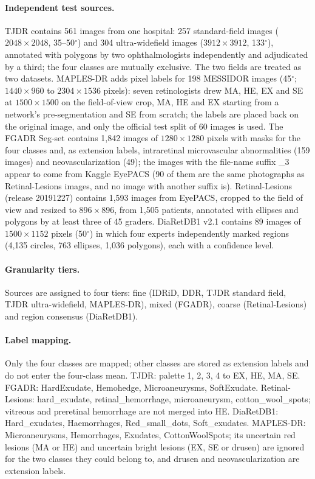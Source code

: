 \paragraph{Independent test sources.} TJDR\cite{mao2023tjdr} contains 561 images from one hospital: 257 standard-field images ($2048\times2048$, 35--50$^\circ$) and 304 ultra-widefield images ($3912\times3912$, 133$^\circ$), annotated with polygons by two ophthalmologists independently and adjudicated by a third; the four classes are mutually exclusive. The two fields are treated as two datasets. MAPLES-DR\cite{maplesdr2024scientificdata} adds pixel labels for 198 MESSIDOR\cite{decenciere2014messidor} images (45$^\circ$; $1440\times960$ to $2304\times1536$ pixels): seven retinologists drew MA, HE, EX and SE at $1500\times1500$ on the field-of-view crop, MA, HE and EX starting from a network's pre-segmentation and SE from scratch; the labels are placed back on the original image, and only the official test split of 60 images is used. The FGADR Seg-set\cite{zhou2021fgadr} contains 1,842 images of $1280\times1280$ pixels with masks for the four classes and, as extension labels, intraretinal microvascular abnormalities (159 images) and neovascularization (49); the images with the file-name suffix \_3 appear to come from Kaggle EyePACS (90 of them are the same photographs as Retinal-Lesions images, and no image with another suffix is). Retinal-Lesions\cite{wei2020retinallesionslesionnet} (release 20191227) contains 1,593 images from EyePACS\cite{cuadros2009eyepacs}, cropped to the field of view and resized to $896\times896$, from 1,505 patients, annotated with ellipses and polygons by at least three of 45 graders. DiaRetDB1 v2.1\cite{kauppi2007diaretdb1} contains 89 images of $1500\times1152$ pixels (50$^\circ$) in which four experts independently marked regions (4,135 circles, 763 ellipses, 1,036 polygons), each with a confidence level.

\paragraph{Granularity tiers.} Sources are assigned to four tiers: fine (IDRiD, DDR, TJDR standard field, TJDR ultra-widefield, MAPLES-DR), mixed (FGADR), coarse (Retinal-Lesions) and region consensus (DiaRetDB1).

\paragraph{Label mapping.} Only the four classes are mapped; other classes are stored as extension labels and do not enter the four-class mean. TJDR: palette 1, 2, 3, 4 to EX, HE, MA, SE. FGADR: HardExudate, Hemohedge, Microaneurysms, SoftExudate. Retinal-Lesions: hard\_exudate, retinal\_hemorrhage, microaneurysm, cotton\_wool\_spots; vitreous and preretinal hemorrhage are not merged into HE. DiaRetDB1: Hard\_exudates, Haemorrhages, Red\_small\_dots, Soft\_exudates. MAPLES-DR: Microaneurysms, Hemorrhages, Exudates, CottonWoolSpots; its uncertain red lesions (MA or HE) and uncertain bright lesions (EX, SE or drusen) are ignored for the two classes they could belong to, and drusen and neovascularization are extension labels.

